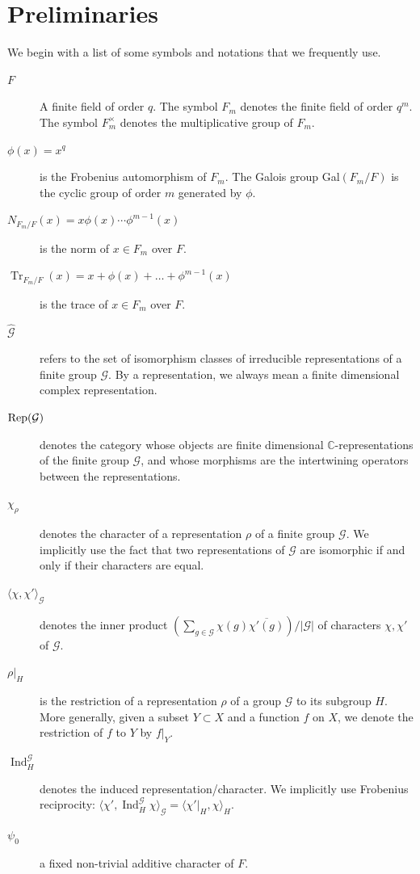 \documentclass[reqno]{amsart}
\theoremstyle{definition}
\theoremstyle{remark}
\numberwithin{equation}{section}
\newcommand{\bC}{\mathbb C} \newcommand{\bF}{\mathbb F}
\DeclareMathOperator{\Ind}{Ind}
\DeclareMathOperator{\tr}{Tr}
\begin{document}
\section{Preliminaries} \label{prelim}
We begin with a list of some symbols and notations that we frequently use.
\begin{description}
\item [$F$] A finite field of order $q$. The symbol $F_m$ denotes the finite field of order $q^m$. The symbol $F_m^\times$ denotes the multiplicative group of $F_m$.
\item [$\phi(x)=x^q$] is the Frobenius automorphism of $F_m$. The Galois group Gal$(F_m/F)$ is the cyclic group of order $m$ generated by $\phi$.
\item [$N_{F_m/F}(x)=x \phi(x) \cdots \phi^{m-1}(x)$] is the norm of $x \in F_m$ over $F$.
\item [$\tr_{F_m/F}(x)=x+\phi(x) +\dots +\phi^{m-1}(x)$] is the trace of $x \in F_m$ over $F$.
\item[$\widehat{\mathcal G}$] refers to the set of isomorphism classes of irreducible representations of a finite group $\mathcal G$. By a representation, we always mean a finite dimensional complex representation.
\item [${\rm Rep}(\mathcal G)$]  denotes the category whose objects are finite dimensional $\bC$-representations of the finite group $\mathcal G$, and whose  morphisms are the intertwining operators between the representations. 
\item [$\chi_{\rho}$] denotes the character of  a representation $\rho$ of a finite group $\mathcal G$. We implicitly use the fact that two representations of $\mathcal G$ are isomorphic if and only if their characters are equal.
\item [$\langle \chi, \chi'\rangle_\mathcal{G}$] denotes the inner product $(\sum_{g \in \mathcal G} \chi(g) \overline{\chi'(g)} )/|\mathcal G|$ of characters $\chi, \chi'$ of $\mathcal G$.
\item [$\rho|_{H}$] is the restriction of a representation $\rho$ of a group $\mathcal G$ to its subgroup $H$. More generally, given a subset $Y \subset X$ and a function $f$ on $X$, we denote the restriction of $f$ to $Y$ by   $f|_{Y}$.
\item [$\Ind_H^\mathcal{G}$] denotes the induced representation/character. We implicitly use Frobenius reciprocity: $\langle \chi', \Ind_H^\mathcal{G} \chi \rangle_\mathcal{G}=\langle \chi'|_{H}, \chi \rangle_H$.
\item[$\psi_0$]  a fixed non-trivial additive character of $F$.

\end{description}
\end{document}
